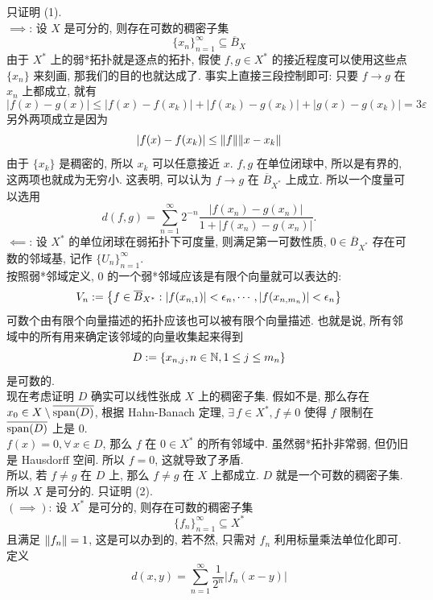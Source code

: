         \begin{prf}
            只证明 (1). \\
            \(\implies\): 设 \(X\) 是可分的, 则存在可数的稠密子集
            \[\{x_n\}_{n=1}^{\infty}\subseteq\overline{B}_X \]
            由于 \(X^*\) 上的弱*拓扑就是逐点的拓扑, 假使 \(f,g\in X^*\) 的接近程度可以使用这些点 \(\{x_n\}\) 来刻画, 那我们的目的也就达成了. 事实上直接三段控制即可: 只要 \(f\to g\) 在 \(x_n\) 上都成立, 就有
            \[|f(x)-g(x)|\leq|f(x)-f(x_k)|+|f(x_k)-g(x_k)|+|g(x)-g(x_k)| =3\varepsilon \]
            另外两项成立是因为
            \[|f(x)-f(x_k)|\leq\norm{f}\norm{x-x_k} \]
            由于 \(\{x_k\}\) 是稠密的, 所以 \(x_k\) 可以任意接近 \(x\). \(f,g\) 在单位闭球中, 所以是有界的, 这两项也就成为无穷小.
            这表明, 可以认为 \(f\to g\) 在 \(\overline{B}_{X^*}\) 上成立. 所以一个度量可以选用
            \[d(f,g)=\sum_{n=1}^{\infty}2^{-n}\frac{|f(x_n)-g(x_n)|}{1+|f(x_n)-g(x_n)|}.\]
            \(\impliedby\): 设 \(X^*\) 的单位闭球在弱拓扑下可度量, 则满足第一可数性质, \(0\in \overline{B}_{X^*}\) 存在可数的邻域基, 记作 \(\{U_n\}_{n=1}^{\infty}\). \\
            按照弱*邻域定义, \(0\) 的一个弱*邻域应该是有限个向量就可以表达的:
            \[V_n:=\qty{f\in \overline{B}_{X^*}: |f(x_{n,1})|<\epsilon_n, \cdots, |f(x_{n,m_n})|<\epsilon_n }\]
            可数个由有限个向量描述的拓扑应该也可以被有限个向量描述. 也就是说, 所有邻域中的所有用来确定该邻域的向量收集起来得到
            \[D:=\{x_{n,j}, n\in\operatorname{\mathbb{N}}, 1\leq j\leq m_n\}\]
            是可数的.\\
            现在考虑证明 \(D\) 确实可以线性张成 \(X\) 上的稠密子集. 假如不是, 那么存在 \(x_0\in X\setminus\overline{\operatorname{span}(D)}\), 根据 Hahn-Banach 定理, \(\exists\,f\in X^*, f\neq 0\) 使得 \(f\) 限制在 \(\overline{\operatorname{span}(D)}\) 上是 \(0\). \\
            \(f(x)=0, \forall\,x\in D\), 那么 \(f\) 在 \(0\in X^*\) 的所有邻域中. 虽然弱*拓扑非常弱, 但仍旧是 Hausdorff 空间. 所以 \(f=0\), 这就导致了矛盾. \\
            所以, 若 \(f\neq g\) 在 \(D\) 上, 那么 \(f\neq g\) 在 \(X\) 上都成立. \(D\) 就是一个可数的稠密子集. 所以 \(X\) 是可分的.
            \iffalse
            只证明 (2). \\
            \((\implies)\): 设 \(X^*\) 是可分的, 则存在可数的稠密子集
            \[\{f_n\}_{n=1}^{\infty}\subseteq X^*\]
            且满足 \(\norm{f_n}=1\), 这是可以办到的, 若不然, 只需对 \(f_n\) 利用标量乘法单位化即可.\\
            定义
            \[d(x,y) = \sum_{n=1}^{\infty} \frac{1}{2^n} |f_n(x-y)|\]

\end{prf}

